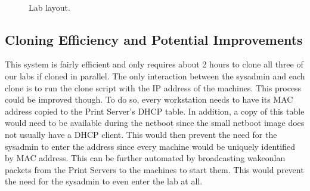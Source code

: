 \begin{figure}
  \begin{center}
  \end{center}
  \caption{Lab layout.}
  \label{fig:RoomNetworkLayout}
\
\vskip1pt
\ 
\vskip1pt
\ 
\end{figure}


\subsection{Cloning Efficiency and Potential Improvements}
This system is fairly efficient and only requires about 2 hours to clone all three of our labs if cloned in parallel.  The only interaction between the sysadmin and each clone is to run the clone script with the IP address of the machines.  This process could be improved though.  To do so, every workstation needs to have its MAC address copied to the Print Server's DHCP table.  In addition, a copy of this table would need to be available during the netboot since the small netboot image does not usually have a DHCP client.  This would then prevent the need for the sysadmin to enter the address since every machine would be uniquely identified by MAC address.  This can be further automated by broadcasting wakeonlan packets from the Print Servers to the machines to start them.  This would prevent the need for the sysadmin to even enter the lab at all.  

